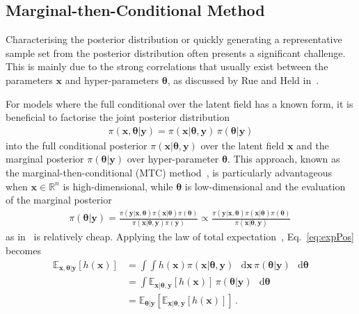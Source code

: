 \documentclass{article}
\newcommand{\diff}{\mathop{}\!\mathrm{d}}
\begin{document}
\subsection{Marginal-then-Conditional Method}
\label{subsec:TheoMTC}
Characterising the posterior distribution or quickly generating a representative sample set from the posterior distribution often presents a significant challenge. 
This is mainly due to the strong correlations that usually exist between the parameters $\bm{x}$ and hyper-parameters $\bm{\theta}$, as discussed by Rue and Held in~\cite{rue2005gaussian}.

For models where the full conditional over the latent field has a known form, it is beneficial to factorise the joint posterior distribution
\begin{align}
	\pi(\bm{x}, \bm{\theta} |  \bm{y}) = \pi(\bm{x} |  \bm{\theta}, \bm{y}) \, \pi(\bm{\theta} |   \bm{y}) \label{eq:MTC}
\end{align}
into the full conditional posterior $\pi(\bm{x} |  \bm{\theta}, \bm{y})$ over the latent field $\bm{x}$ and the marginal posterior $ \pi(\bm{\theta} |   \bm{y})$ over hyper-parameter $\bm{\theta}$.
This approach, known as the marginal-then-conditional (MTC) method~\cite{fox2016fast}, is particularly advantageous when $\bm{x}\in \mathbb{R}^n$ is high-dimensional, while $\bm{\theta}$ is low-dimensional and the evaluation of the marginal posterior
\begin{align}
	\pi(\bm{\theta} |   \bm{y}) =  \frac{ \pi(   \bm{y} | \bm{x},\bm{\theta})  \pi( \bm{x} | \bm{\theta} )  \pi(\bm{\theta}) }{ \pi(\bm{x} | \bm{\theta} ,   \bm{y})   \pi( \bm{y})} \propto \frac{ \pi(   \bm{y} | \bm{x},\bm{\theta})  \pi( \bm{x} | \bm{\theta} )  \pi(\bm{\theta}) }{ \pi(\bm{x} | \bm{\theta} ,   \bm{y}) } \label{eq:margGen}\, 
\end{align}
as in~\cite[Lemma 2]{fox2016fast} is relatively cheap.
Applying the law of total expectation~\cite{champ2022generalizedlawtotalcovariance}, Eq.~\eqref{eq:expPos} becomes
\begin{align}
	\mathbb{E}_{\bm{x} ,\bm{\theta}  |\bm{y}} [h(\bm{x})] &= \int \int   h(\bm{x}) \pi(\bm{x} |  \bm{\theta}, \bm{y}) \, \diff \bm{x} \,  \pi(\bm{\theta} |   \bm{y}) \, \diff \bm{\theta} \\
	&= \int \mathbb{E}_{\bm{x} |  \bm{\theta}, \bm{y}} \left[ h(\bm{x}) \right] \, \pi(\bm{\theta} |  \bm{y}) \, \diff \bm{\theta}\label{eq:2fullCond} \\
	&= \mathbb{E}_{\bm{\theta} |  \bm{y}} \left[ \mathbb{E}_{\bm{x} |  \bm{\theta}, \bm{y}} [h(\bm{x})] \right] \, .
	\label{eq:fullCond}
\end{align}
\end{document}
